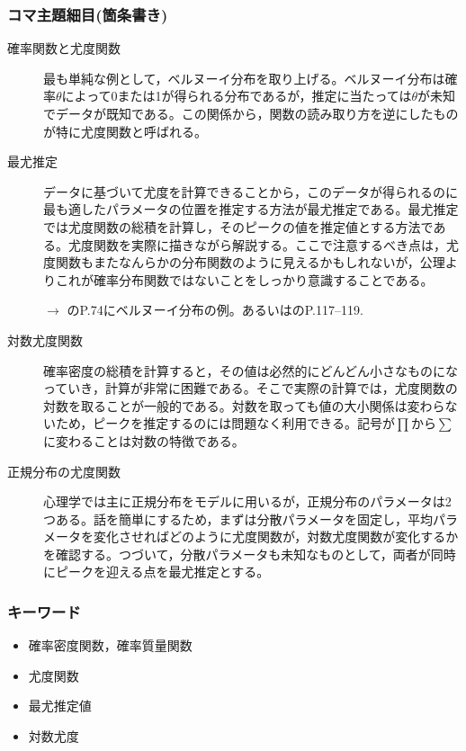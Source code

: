 \subsubsection{コマ主題細目(箇条書き)}
\begin{description}
\item[確率関数と尤度関数]最も単純な例として，ベルヌーイ分布を取り上げる。ベルヌーイ分布は確率$\theta$によって0または1が得られる分布であるが，推定に当たっては$\theta$が未知でデータが既知である。この関係から，関数の読み取り方を逆にしたものが特に尤度関数と呼ばれる。

\item[最尤推定]データに基づいて尤度を計算できることから，このデータが得られるのに最も適したパラメータの位置を推定する方法が最尤推定である。最尤推定では尤度関数の総積を計算し，そのピークの値を推定値とする方法である。尤度関数を実際に描きながら解説する。ここで注意するべき点は，尤度関数もまたなんらかの分布関数のように見えるかもしれないが，公理よりこれが確率分布関数ではないことをしっかり意識することである。
\begin{flushright}
    $\to$ \citet{野島201903}のP.74にベルヌーイ分布の例。あるいは\citet{kosugi2018}のP.117--119.
\end{flushright}


\item[対数尤度関数]確率密度の総積を計算すると，その値は必然的にどんどん小さなものになっていき，計算が非常に困難である。そこで実際の計算では，尤度関数の対数を取ることが一般的である。対数を取っても値の大小関係は変わらないため，ピークを推定するのには問題なく利用できる。記号が$\prod$から$\sum$に変わることは対数の特徴である。

\item[正規分布の尤度関数]心理学では主に正規分布をモデルに用いるが，正規分布のパラメータは2つある。話を簡単にするため，まずは分散パラメータを固定し，平均パラメータを変化させればどのように尤度関数が，対数尤度関数が変化するかを確認する。つづいて，分散パラメータも未知なものとして，両者が同時にピークを迎える点を最尤推定とする。

\end{description}
\subsubsection{キーワード}
\begin{itemize}
\item 確率密度関数，確率質量関数
\item 尤度関数
\item 最尤推定値
\item 対数尤度
\end{itemize}
